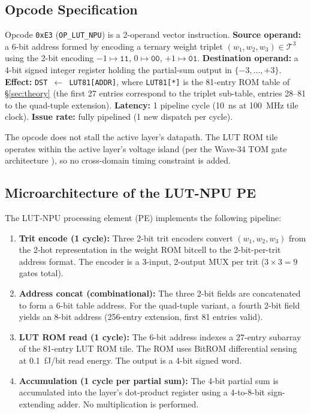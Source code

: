 \subsection{Opcode Specification}

\begin{definition}
\label{def:op_lut_npu}
Opcode \texttt{0xE3} (\texttt{OP\_LUT\_NPU}) is a 2-operand vector instruction.
\textbf{Source operand:} a 6-bit address formed by encoding a ternary weight
triplet $(w_1, w_2, w_3) \in \mathcal{T}^3$ using the 2-bit encoding
$-1 \mapsto \mathtt{11}$, $0 \mapsto \mathtt{00}$, $+1 \mapsto \mathtt{01}$.
\textbf{Destination operand:} a 4-bit signed integer register holding the
partial-sum output in $\{-3,\ldots,+3\}$.
\textbf{Effect:} \texttt{DST $\leftarrow$ LUT81[ADDR]}, where
\texttt{LUT81[*]} is the 81-entry ROM table of
\S\ref{sec:theory} (the first 27 entries correspond to the triplet sub-table,
entries 28--81 to the quad-tuple extension).
\textbf{Latency:} 1 pipeline cycle (10~ns at 100~MHz tile clock).
\textbf{Issue rate:} fully pipelined (1 new dispatch per cycle).
\end{definition}

The opcode does not stall the active layer's datapath.  The LUT ROM tile
operates within the active layer's voltage island (per the Wave-34 TOM
gate architecture \cite{glava80_tom_layer_gate}), so no cross-domain
timing constraint is added.

\subsection{Microarchitecture of the LUT-NPU PE}

The LUT-NPU processing element (PE) implements the following pipeline:

\begin{enumerate}
  \item \textbf{Trit encode (1 cycle):}  Three 2-bit trit encoders convert
    $(w_1, w_2, w_3)$ from the 2-hot representation in the weight ROM bitcell
    to the 2-bit-per-trit address format.  The encoder is a 3-input, 2-output
    MUX per trit ($3 \times 3 = 9$ gates total).

  \item \textbf{Address concat (combinational):}  The three 2-bit fields are
    concatenated to form a 6-bit table address.  For the quad-tuple variant,
    a fourth 2-bit field yields an 8-bit address (256-entry extension, first
    81 entries valid).

  \item \textbf{LUT ROM read (1 cycle):}  The 6-bit address indexes a 27-entry
    subarray of the 81-entry LUT ROM tile.  The ROM uses BitROM differential
    sensing \cite{bitrom_2025} at 0.1~fJ/bit read energy.  The output is a
    4-bit signed word.

  \item \textbf{Accumulation (1 cycle per partial sum):}  The 4-bit partial
    sum is accumulated into the layer's dot-product register using a 4-to-8-bit
    sign-extending adder.  No multiplication is performed.
\end{enumerate}

